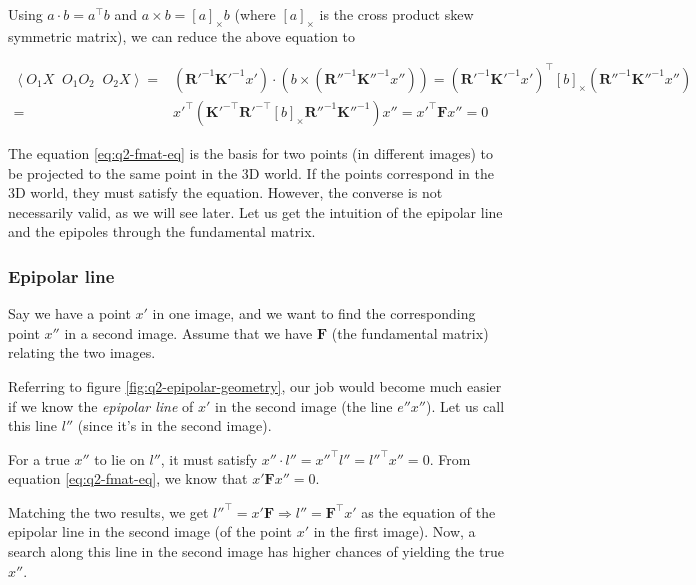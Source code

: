 Using $a \cdot b = a^\top b$ and $a \times b = \left [ a \right ]_\times b$ (where $\left [ a \right ]_\times$ is the cross product skew symmetric matrix), we can reduce the above equation to

\begin{align}
    \left \langle O_1 X \;\; O_1 O_2 \;\; O_2 X \right \rangle =& \left ( \mathbf{R}'^{-1} \mathbf{K}'^{-1} x' \right ) \cdot \left ( b \times \left ( \mathbf{R}''^{-1} \mathbf{K}''^{-1} x'' \right ) \right ) =
        \left ( \mathbf{R}'^{-1} \mathbf{K}'^{-1} x' \right )^\top \left [ b \right ]_\times \left ( \mathbf{R}''^{-1} \mathbf{K}''^{-1} x'' \right )
    \nonumber \\
    =& x'^\top \left ( \mathbf{K}'^{-\top} \mathbf{R}'^{-\top} \left [ b \right ]_\times \mathbf{R}''^{-1} \mathbf{K}''^{-1} \right ) x'' = x'^\top \mathbf{F} x'' = 0
    \label{eq:q2-fmat-eq}
\end{align}

The equation \ref{eq:q2-fmat-eq} is the basis for two points (in different images) to be projected to the same point in the 3D world. If the points correspond in the 3D world, they must satisfy the equation. However, the converse is not necessarily valid, as we will see later. Let us get the intuition of the epipolar line and the epipoles through the fundamental matrix.

\subsubsection*{Epipolar line}

Say we have a point $x'$ in one image, and we want to find the corresponding point $x''$ in a second image. Assume that we have $\mathbf{F}$ (the fundamental matrix) relating the two images.

Referring to figure \ref{fig:q2-epipolar-geometry}, our job would become much easier if we know the \textit{epipolar line} of $x'$ in the second image (the line $e''x''$). Let us call this line $l''$ (since it's in the second image).

For a true $x''$ to lie on $l''$, it must satisfy $x'' \cdot l'' = x''^\top l'' = l''^\top x'' = 0$. From equation \ref{eq:q2-fmat-eq}, we know that $x' \mathbf{F} x'' = 0$.

Matching the two results, we get $l''^\top = x' \mathbf{F} \Rightarrow l'' = \mathbf{F}^\top x' $ as the equation of the epipolar line in the second image (of the point $x'$ in the first image). Now, a search along this line in the second image has higher chances of yielding the true $x''$.

